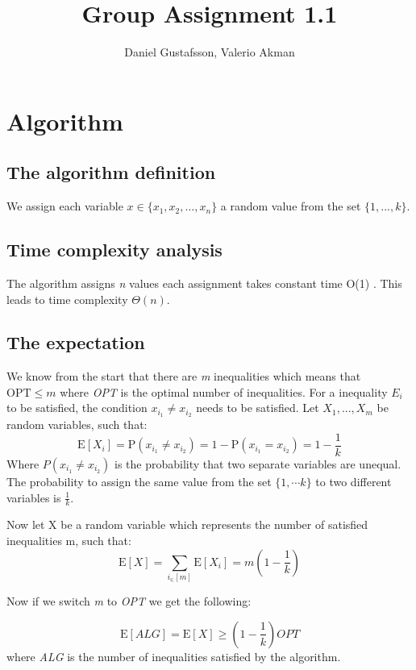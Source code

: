 \documentclass[11pt,a4paper]{article}
\title{Group Assignment 1.1}
\author{Daniel Gustafsson, Valerio Akman}
\begin{document}
\maketitle

\section{Algorithm}
\subsection{The algorithm definition}
We assign each variable $x \in \{x_1, x_2, ... ,x_n\}$ a random value from the set $\{1,...,k\}$.

\subsection{Time complexity analysis}
The algorithm assigns \textit{n} values each assignment takes constant time O(1) .  This leads to time complexity $\Theta (n)$.

\subsection{The expectation}
We know from the start that there are \textit{m} inequalities which means that $\text{OPT} \leq m$ where \textit{OPT} is the optimal number of inequalities.
For a inequality $E_i$ to be satisfied, the condition $x_{i_1} \ne x_{i_2}$ needs to be satisfied. Let $X_1,...,X_m$ be random variables, such that: 
\[\text{E}[X_i] = \text{P}(x_{i_1} \ne x_{i_2}) = 1 - \text{P}(x_{i_1} = x_{i_2}) = 1 - \frac{1}{k}\]
Where $P(x_{i_1} \ne x_{i_2})$ is the probability that two separate variables are unequal. The probability to assign the same value from the set $\{1, \cdots k\}$ to two different variables is $\frac{1}{k}$.

Now let X be a random variable which represents the number of satisfied inequalities m, such that:
\[\text{E}[X] = \sum_{i_\in [m]} \text{E}[X_i] = m(1 - \frac{1}{k}) \]

Now if we switch \textit{m} to \textit{OPT} we get the following:

\[\text{E}[ALG] = \text{E}[X] \geq (1 - \frac{1}{k})OPT\]
where \textit{ALG} is the number of inequalities satisfied by the algorithm.
\end{document}
